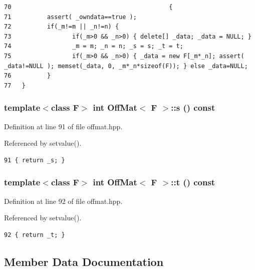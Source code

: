 \footnotesize\begin{verbatim}70                                            {
71          assert( _owndata==true );
72          if(_m!=m || _n!=n) {
73                 if(_m>0 && _n>0) { delete[] _data; _data = NULL; } 
74                 _m = m; _n = n; _s = s; _t = t;
75                 if(_m>0 && _n>0) { _data = new F[_m*_n]; assert( _data!=NULL ); memset(_data, 0, _m*_n*sizeof(F)); } else _data=NULL;
76          }
77   }
\end{verbatim}\normalsize 


\subsubsection{\setlength{\rightskip}{0pt plus 5cm}template$<$class F$>$ int {\bf Off\-Mat}$<$ F $>$::s () const\hspace{0.3cm}{\tt  [inline]}}\label{classOffMat_718f9fe30c4c5a49a2c162d5d70c314b_718f9fe30c4c5a49a2c162d5d70c314b}




Definition at line 91 of file offmat.hpp.

Referenced by setvalue().

\footnotesize\begin{verbatim}91 { return _s; }
\end{verbatim}\normalsize 


\subsubsection{\setlength{\rightskip}{0pt plus 5cm}template$<$class F$>$ int {\bf Off\-Mat}$<$ F $>$::t () const\hspace{0.3cm}{\tt  [inline]}}\label{classOffMat_0fd352f0e5ea01103675de15233b95bd_0fd352f0e5ea01103675de15233b95bd}




Definition at line 92 of file offmat.hpp.

Referenced by setvalue().

\footnotesize\begin{verbatim}92 { return _t; }
\end{verbatim}\normalsize 




\subsection{Member Data Documentation}
